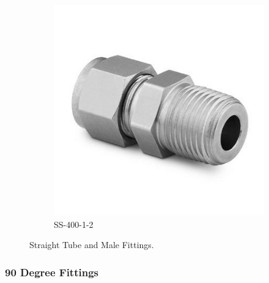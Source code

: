 \documentclass[a4paper,12pt,oneside]{article}
\begin{document}
\begin{appendices}
\begin{figure}[H]
\begin{subfigure}[b]{0.2\textwidth}
    \includegraphics[width=\textwidth]{appendix/img/interfaces/SS-400-1-2.jpg}
    \caption{SS-400-1-2}
    \end{subfigure}
    \caption{Straight Tube and Male Fittings.}
    \label{Appx:Straight_fittings}
\end{figure}



\subsubsection{90 Degree Fittings}


\end{appendices}
\end{document}
